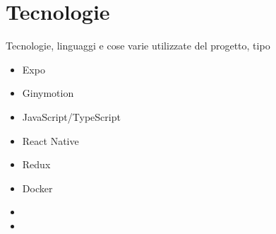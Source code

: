
\chapter{Tecnologie}\label{chap:tec}
Tecnologie, linguaggi e cose varie utilizzate del progetto, tipo 
\begin{itemize}
	\item Expo
	\item Ginymotion
	\item JavaScript/TypeScript
	\item React Native
	\item Redux
	\item Docker
	\item {}
	\item {}
\end{itemize}